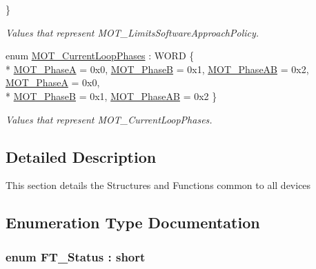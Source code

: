 \begin{DoxyCompactItemize}
 \}\begin{DoxyCompactList}\small\item\em Values that represent M\+O\+T\+\_\+\+Limits\+Software\+Approach\+Policy. \end{DoxyCompactList}
\item 
enum \hyperlink{group___common_gab2d264a3167428788845f683b62cf9ef}{M\+O\+T\+\_\+\+Current\+Loop\+Phases} \+: W\+O\+RD \{ \\*
\hyperlink{group___common_ggab2d264a3167428788845f683b62cf9efa19a60a25eb98ca0e4cb0fb8bf4b79bf5}{M\+O\+T\+\_\+\+PhaseA} = 0x0, 
\hyperlink{group___common_ggab2d264a3167428788845f683b62cf9efab4421b1c8eb15cd48614ecfe76815b65}{M\+O\+T\+\_\+\+PhaseB} = 0x1, 
\hyperlink{group___common_ggab2d264a3167428788845f683b62cf9efa08f328e4274855838333f3fa4cf150d9}{M\+O\+T\+\_\+\+Phase\+AB} = 0x2, 
\hyperlink{group___common_ggab2d264a3167428788845f683b62cf9efa19a60a25eb98ca0e4cb0fb8bf4b79bf5}{M\+O\+T\+\_\+\+PhaseA} = 0x0, 
\\*
\hyperlink{group___common_ggab2d264a3167428788845f683b62cf9efab4421b1c8eb15cd48614ecfe76815b65}{M\+O\+T\+\_\+\+PhaseB} = 0x1, 
\hyperlink{group___common_ggab2d264a3167428788845f683b62cf9efa08f328e4274855838333f3fa4cf150d9}{M\+O\+T\+\_\+\+Phase\+AB} = 0x2
 \}\begin{DoxyCompactList}\small\item\em Values that represent M\+O\+T\+\_\+\+Current\+Loop\+Phases. \end{DoxyCompactList}
\end{DoxyCompactItemize}


\subsection{Detailed Description}
This section details the Structures and Functions common to all devices 

\subsection{Enumeration Type Documentation}
\subsubsection[{\texorpdfstring{F\+T\+\_\+\+Status}{FT_Status}}]{\setlength{\rightskip}{0pt plus 5cm}enum {\bf F\+T\+\_\+\+Status} \+: short}\hypertarget{group___common_ga9de42f4b466f017bd6daf4e230259f63}{}\label{group___common_ga9de42f4b466f017bd6daf4e230259f63}


